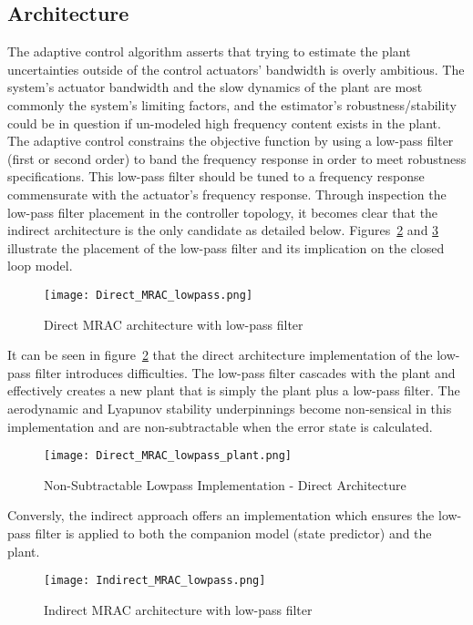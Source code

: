 \subsection{\Lone Architecture}
The \Lone adaptive control algorithm asserts that trying to estimate the plant uncertainties outside of the control actuators' bandwidth is overly ambitious.  The system's actuator bandwidth and the slow dynamics of the plant are most commonly the system's limiting factors, and the estimator's robustness/stability could be in question if un-modeled high frequency content exists in the plant.  %
The \Lone adaptive control constrains the objective function by using a low-pass filter (first or second order) to band the frequency response in order to meet robustness specifications.  This low-pass filter should be tuned to a frequency response commensurate with the actuator's frequency response.  Through inspection the low-pass filter placement in the controller topology, it becomes clear that the indirect architecture is the only candidate as detailed below.  Figures~\ref{fig:direct_mrac_lowpass} and \ref{fig:indirect_mrac_lowpass} illustrate the placement of the low-pass filter and its implication on the closed loop model. 

\begin{figure}[h!]
 \centering
  \texttt{[image: Direct\_MRAC\_lowpass.png]}
  \caption{Direct \ac{MRAC} architecture with low-pass filter }
  \label{fig:direct_mrac_lowpass}
\end{figure}
 It can be seen in figure~\ref{fig:direct_mrac_lowpass} that the direct architecture implementation of the low-pass filter introduces difficulties.  The low-pass filter cascades with the plant and effectively creates a new plant that is simply the plant plus a low-pass filter.  The aerodynamic and Lyapunov stability underpinnings become non-sensical in this implementation and are non-subtractable when the error state is calculated.
\begin{figure}[h!]
 \centering
  \texttt{[image: Direct\_MRAC\_lowpass\_plant.png]}
  \caption{Non-Subtractable Lowpass Implementation - Direct Architecture}
  \label{fig:direct_mrac_lowpass}
\end{figure}

Conversly, the indirect approach offers an implementation which ensures the low-pass filter is applied to both the companion model (state predictor) and the plant.
\begin{figure}[h!]
 \centering
  \texttt{[image: Indirect\_MRAC\_lowpass.png]}
  \caption{Indirect \ac{MRAC} architecture with low-pass filter }
  \label{fig:indirect_mrac_lowpass}
\end{figure}

